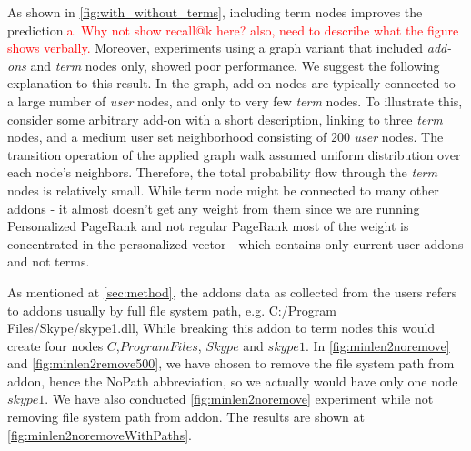 \documentclass[11pt,oneside]{book}
\begin{document}
As shown in
\autoref{fig:with_without_terms}, including term nodes improves the prediction.\textcolor{red}{a. Why not show recall@k here? also, need to describe what the figure shows verbally.} Moreover, experiments using a graph variant that included {\it add-ons} and {\it term} nodes only, showed poor performance. We suggest the following explanation to this result. In the graph, add-on nodes are typically connected to a large number of {\it user} nodes, and only to very few {\it term} nodes. To illustrate this, consider some arbitrary add-on with a short description, linking to three {\it term} nodes, and a medium user set neighborhood consisting of 200 {\it user} nodes. 
The transition operation of the applied graph walk assumed uniform distribution over each node's neighbors. Therefore, the total probability flow through the {\it term} nodes is relatively small. While term node might be connected to many other
addons - it almost doesn't get any weight from them since we are
running Personalized PageRank and not regular PageRank most of the
weight is concentrated in the personalized vector - which contains
only current user addons and not terms.

As mentioned at \autoref{sec:method}, the addons data as collected
from the users refers to addons usually by full file system path,
e.g. C:/Program Files/Skype/skype1.dll, While breaking this addon to
term nodes this would create four nodes $C$,$Program Files$, $Skype$
and $skype1$. In \autoref{fig:minlen2noremove} and
\autoref{fig:minlen2remove500}, we have chosen to remove the file
system path from addon, hence the NoPath abbreviation, so we actually
would have only one node $skype1$. We have also conducted
\autoref{fig:minlen2noremove} experiment while not removing file
system path from addon. The results are shown at
\autoref{fig:minlen2noremoveWithPaths}.
\end{document}
